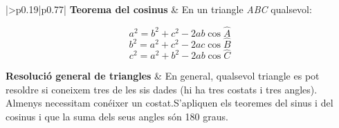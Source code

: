 \begin{center}
\begin{longtable}[h]{|>{\raggedleft\arraybackslash}p{0.19\linewidth}|p{0.77\linewidth}|}
\noindent \textbf{Teorema del cosinus}  &   
En un triangle\textit{ ABC} qualsevol: 

\[a^{2} =b^{2} +c^{2} -2ab\cos \hat A \]
\[b^{2} =a^{2} +c^{2} -2ac\cos \hat B \]
\[c^{2} =a^{2} +b^{2} -2ab\cos \hat C \]
\hline

\noindent \textbf{Resolució general de triangles}  &   
En general, qualsevol triangle es pot resoldre si coneixem tres de les sis dades (hi ha tres costats i tres angles). Almenys necessitam conéixer un costat.\newline S'apliquen els teoremes del sinus i del cosinus i que la suma dels seus angles són 180 graus.  
\hline \bottomrule
	\end{longtable}
\end{center}

\pagebreak
 

